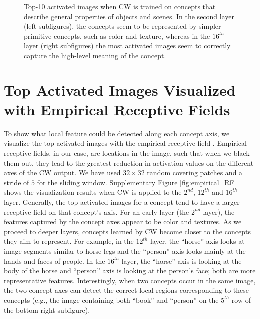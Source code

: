 \documentclass{article}
\begin{document}
\begin{figure}[htbp]
  \caption{Top-10 activated images when CW is trained on concepts that describe general properties of objects and scenes. In the second layer (left subfigures), the concepts seem to be represented by simpler primitive concepts, such as color and texture, whereas in the $16^{th}$ layer (right subfigures) the most activated images seem to correctly capture the high-level meaning of the concept.}
  \label{fig:top10_general}
\end{figure}

\section{Top Activated Images Visualized with Empirical Receptive Fields}\label{sec:receptive_fields}
To show what local feature could be detected along each concept axis, we visualize the top activated images with the empirical receptive field \cite{zhou2014object}. Empirical receptive fields, in our case, are locations in the image, such that when we black them out, they lead to the greatest reduction in activation values on the different axes of the CW output. We have used $32\times 32$ random covering patches and a stride of $5$ for the sliding window. Supplementary Figure  \ref{fig:empirical_RF} shows the visualization results when CW is applied to the $2^{nd}$, $12^{th}$ and $16^{th}$ layer. Generally, the top activated images for a concept tend to have a larger receptive field on that concept's axis. For an early layer (the $2^{nd}$ layer), the features captured by the concept axes appear to be color and textures. As we proceed to deeper layers, concepts learned by CW become closer to the concepts they aim to represent. For example, in the $12^{th}$ layer, the ``horse'' axis looks at image segments similar to horse legs and the ``person'' axis looks mainly at the hands and faces of people. In the $16^{th}$ layer, the ``horse'' axis is looking at the body of the horse and ``person'' axis is looking at the person's face; both are more representative features. Interestingly, when two concepts occur in the same image, the two concept axes can detect the correct local regions corresponding to these concepts (e.g., the image containing both ``book'' and ``person'' on the $5^{th}$ row of the bottom right subfigure).
\end{document}
